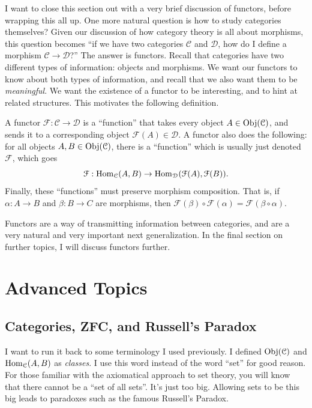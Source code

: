 \documentclass[11pt, letterpaper]{article}
\begin{document}
I want to close this section out with a very brief discussion of functors, before wrapping this all up. One more natural question is how to study categories themselves? Given our discussion of how category theory is all about morphisms, this question becomes ``if we have two categories $\mathcal{C} $ and $\mathcal{D} $, how do I define a morphism $\mathcal{C} \to \mathcal{D} $?'' The answer is functors. Recall that categories have two different types of information: objects and morphisms. We want our functors to know about both types of information, and recall that we also want them to be \emph{meaningful}. We want the existence of a functor to be interesting, and to hint at related structures. This motivates the following definition.

\begin{definition}[Functor]\label{dfn:6}
	A functor $\mathcal{F} : \mathcal{C}  \to \mathcal{D} $ is a ``function'' that takes every object $A\in \operatorname{Obj}(\mathcal{C} ) $, and sends it to a corresponding object $\mathcal{F} (A)\in \mathcal{D} $. A functor also does the following: for all objects $A,B\in \operatorname{Obj}(\mathcal{C} ) $, there is a ``function'' which is usually just denoted $\mathcal{F} $, which goes
	\[
		\mathcal{F} : \operatorname{Hom}_{\mathcal{C} }(A, B)  \to \operatorname{Hom}_{\mathcal{D} }(\mathcal{F} (A), \mathcal{F} (B)) 
	.\]
	Finally, these ``functions'' must preserve morphism composition. That is, if $\alpha : A \to B$ and $\beta : B \to C$ are morphisms, then $\mathcal{F} (\beta )\circ \mathcal{F} (\alpha )=\mathcal{F} (\beta \circ \alpha )$.
\end{definition}

Functors are a way of transmitting information between categories, and are a very natural and very important next generalization. In the final section on further topics, I will discuss functors further.



\section{Advanced Topics}

\subsection{Categories, ZFC, and Russell's Paradox}

I want to run it back to some terminology I used previously. I defined $\operatorname{Obj}(\mathcal{C} ) $ and $\operatorname{Hom}_{\mathcal{C} }(A, B) $ as \emph{classes}. I use this word instead of the word ``set'' for good reason. For those familiar with the axiomatical approach to set theory, you will know that there cannot be a ``set of all sets''. It's just too big. Allowing sets to be this big leads to paradoxes such as the famous Russell's Paradox.
\end{document}
